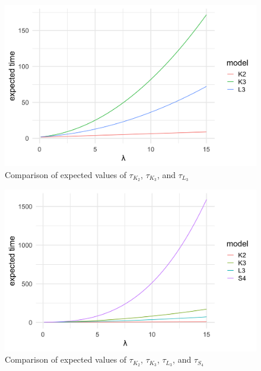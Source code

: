 \begin{figure}[H]
  \centering
    \includegraphics[width=.80\textwidth]{figures/ev_phase_comparison_3.png}
   \caption{Comparison of expected values of $\tau_{K_2}$, $\tau_{K_3}$, and $\tau_{L_3}$}
  \label{fig:ev_phase_comparison_3.png}
\end{figure}

\begin{figure}[H]
  \centering
    \includegraphics[width=.80\textwidth]{figures/ev_phase_comparison_4.png}
   \caption{Comparison of expected values of $\tau_{K_2}$, $\tau_{K_3}$, $\tau_{L_3}$, and $\tau_{S_4}$}
  \label{fig:ev_phase_comparison_4.png}
\end{figure}
